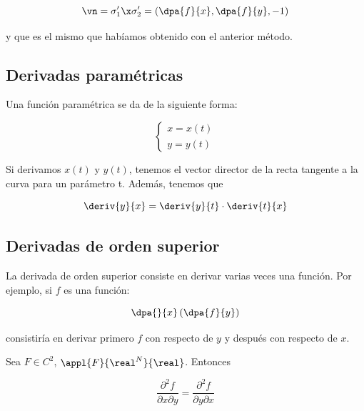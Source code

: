 \documentclass[nochap]{apuntes}
\begin{document}
\[ \vn = \sigma_1'\x\sigma_2' = \left(\dpa{f}{x}, \dpa{f}{y}, -1\right) \]

y que es el mismo que habíamos obtenido con el anterior método.

\subsection{Derivadas paramétricas}

Una función paramétrica se da de la siguiente forma:

\[ \left\lbrace \begin{matrix}
x = x(t) \\ y = y(t)
\end{matrix}\right. \]

Si derivamos $x(t)$ y $y(t)$, tenemos el vector director de la recta tangente a la curva para un parámetro t. Además, tenemos que

\[ \deriv{y}{x} = \deriv{y}{t} \cdot \deriv{t}{x} \]

\subsection{Derivadas de orden superior}

La derivada de orden superior consiste en derivar varias veces una función. Por ejemplo, si $f$ es una función:

\[ \dpa{}{x}\left(\dpa{f}{y}\right)  \]

consistiría en derivar primero $f$ con respecto de $y$ y después con respecto de $x$.

\begin{theorem}
Sea $F\in C^2$, $\appl{F}{\real^N}{\real}$. Entonces

\[ \frac{∂^2 f}{∂x∂y} = \frac{∂^2 f}{∂y∂x} \]
\end{theorem}
\end{document}
